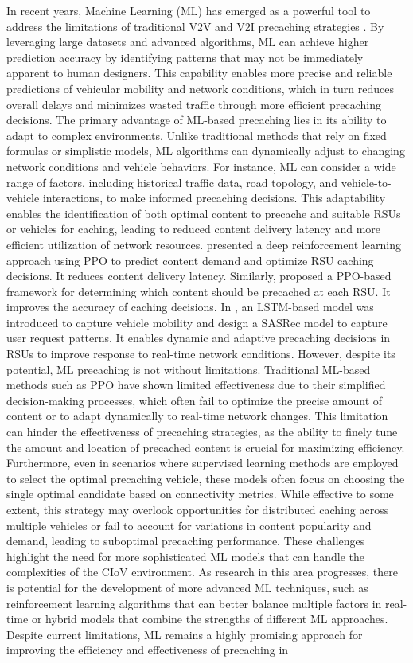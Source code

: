 \documentclass{aims}
\numberwithin{equation}{section}
\begin{document}
In recent years, Machine Learning (ML) has emerged as a powerful tool to address the limitations of traditional V2V and V2I precaching strategies \cite{Zhao2023, Wang2023, Feng2023}. By leveraging large datasets and advanced algorithms, ML can achieve higher prediction accuracy by identifying patterns that may not be immediately apparent to human designers. This capability enables more precise and reliable predictions of vehicular mobility and network conditions, which in turn reduces overall delays and minimizes wasted traffic through more efficient precaching decisions. The primary advantage of ML-based precaching lies in its ability to adapt to complex environments. Unlike traditional methods that rely on fixed formulas or simplistic models, ML algorithms can dynamically adjust to changing network conditions and vehicle behaviors. For instance, ML can consider a wide range of factors, including historical traffic data, road topology, and vehicle-to-vehicle interactions, to make informed precaching decisions. This adaptability enables the identification of both optimal content to precache and suitable RSUs or vehicles for caching, leading to reduced content delivery latency and more efficient utilization of network resources. \cite{Zhao2023} presented a deep reinforcement learning approach using PPO to predict content demand and optimize RSU caching decisions. It reduces content delivery latency. Similarly, \cite{Wang2023} proposed a PPO-based framework for determining which content should be precached at each RSU. It improves the accuracy of caching decisions. In \cite{Feng2023}, an LSTM-based model was introduced to capture vehicle mobility and design a SASRec model to capture user request patterns. It enables dynamic and adaptive precaching decisions in RSUs to improve response to real-time network conditions. However, despite its potential, ML precaching is not without limitations. Traditional ML-based methods such as PPO have shown limited effectiveness due to their simplified decision-making processes, which often fail to optimize the precise amount of content or to adapt dynamically to real-time network changes. This limitation can hinder the effectiveness of precaching strategies, as the ability to finely tune the amount and location of precached content is crucial for maximizing efficiency. Furthermore, even in scenarios where supervised learning methods are employed to select the optimal precaching vehicle, these models often focus on choosing the single optimal candidate based on connectivity metrics. While effective to some extent, this strategy may overlook opportunities for distributed caching across multiple vehicles or fail to account for variations in content popularity and demand, leading to suboptimal precaching performance. These challenges highlight the need for more sophisticated ML models that can handle the complexities of the CIoV environment. As research in this area progresses, there is potential for the development of more advanced ML techniques, such as reinforcement learning algorithms that can better balance multiple factors in real-time or hybrid models that combine the strengths of different ML approaches. Despite current limitations, ML remains a highly promising approach for improving the efficiency and effectiveness of precaching in 
\end{document}
